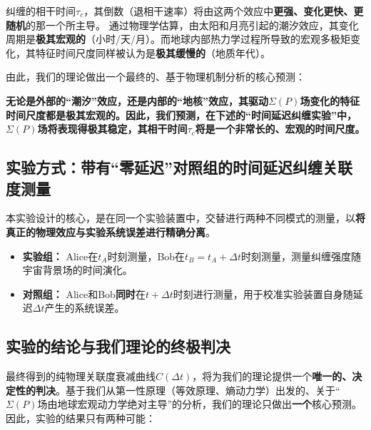 \documentclass[12pt]{article}
\begin{document}
\noindent 纠缠的相干时间$\tau_c$，其倒数（退相干速率）将由这两个效应中\textbf{更强、变化更快、更随机}的那一个所主导。
通过物理学估算，由太阳和月亮引起的潮汐效应，其变化周期是\textbf{极其宏观的}（小时/天/月）。而地球内部热力学过程所导致的宏观多极矩变化，其特征时间尺度同样被认为是\textbf{极其缓慢的}（地质年代）。

\vspace{1em} %
\noindent 由此，我们的理论做出一个最终的、基于物理机制分析的核心预测：

\begin{center}
    \textbf{无论是外部的``潮汐''效应，还是内部的``地核''效应，其驱动$\Sigma(P)$场变化的特征时间尺度都是极其宏观的。因此，我们预测，在下述的``时间延迟纠缠实验''中，$\Sigma(P)$场将表现得极其稳定，其相干时间$\tau_c$将是一个非常长的、宏观的时间尺度。}
\end{center}


\subsection{实验方式：带有``零延迟''对照组的时间延迟纠缠关联度测量}
本实验设计的核心，是在同一个实验装置中，交替进行两种不同模式的测量，以\textbf{将真正的物理效应与实验系统误差进行精确分离}。
\begin{itemize}
    \item   \textbf{实验组：} Alice在$t_A$时刻测量，Bob在$t_B = t_A + \Delta t$时刻测量，测量纠缠强度随宇宙背景场的时间演化。
    \item   \textbf{对照组：} Alice和Bob\textbf{同时}在$t + \Delta t$时刻进行测量，用于校准实验装置自身随延迟$\Delta t$产生的系统误差。
\end{itemize}

\subsection{实验的结论与我们理论的终极判决}

最终得到的纯物理关联度衰减曲线$C(\Delta t)$，将为我们的理论提供一个\textbf{唯一的、决定性的判决}。基于我们从第一性原理（等效原理、熵动力学）出发的、关于``$\Sigma(P)$场由地球宏观动力学绝对主导''的分析，我们的理论只做出\textbf{一个}核心预测。因此，实验的结果只有两种可能：
\end{document}

